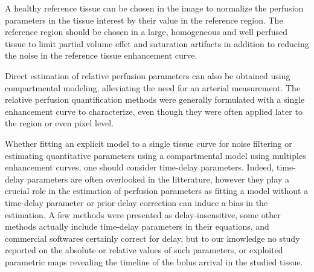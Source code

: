 A healthy reference tissue can be chosen in the image to normalize the perfusion parameters in the tissue interest by their value in the reference region.
The reference region should be chosen in a large, homogeneous and well perfused tissue to limit partial volume effet and saturation artifacts in addition to reducing the noise in the reference tissue enhancement curve.

Direct estimation of relative perfusion parameters can also be obtained using compartmental modeling, alleviating the need for an arterial measurement.
The relative perfusion quantification methods were generally formulated with a single enhancement curve to characterize, even though they were often applied later to the region or even pixel level.

Whether fitting an explicit model to a single tissue curve for noise filtering or estimating quantitative parameters using a compartmental model using multiples enhancement curves, one should consider time-delay parameters.
Indeed, time-delay parameters are often overlooked in the litterature, however they play a crucial role in the estimation of perfusion parameters as fitting a model without a time-delay parameter or prior delay correction can induce a bias in the estimation.
A few methods were presented as delay-insensitive, some other methods actually include time-delay parameters in their equations, and commercial softwares certainly correct for delay, but to our knowledge no study reported on the absolute or relative values of such parameters, or exploited parametric maps revealing the timeline of the bolus arrival in the studied tissue. 



